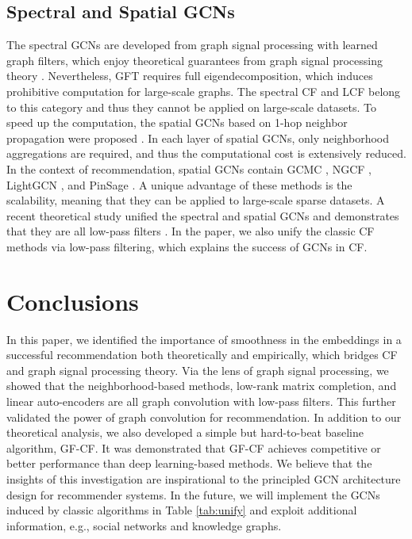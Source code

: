 \documentclass[sigconf]{acmart}
\begin{document}
\subsection{Spectral and Spatial GCNs} The spectral GCNs are developed from graph signal processing with learned graph filters, which enjoy theoretical guarantees from graph signal processing theory \cite{ruiz2021graph}. Nevertheless, GFT requires full eigendecomposition, which induces prohibitive computation for large-scale graphs. The spectral CF \cite{zheng2018spectral} and LCF \cite{yu2020graph} belong to this category and thus they cannot be applied on large-scale datasets. To speed up the computation, the spatial GCNs based on 1-hop neighbor propagation were proposed \cite{xu2018powerful}. In each layer of spatial GCNs, only neighborhood aggregations are required, and thus the computational cost is extensively reduced. In the context of recommendation, spatial GCNs contain GCMC \cite{berg2017graph}, NGCF \cite{wang2019neural}, LightGCN \cite{he2020lightgcn}, and PinSage \cite{ying2018graph}. A unique advantage of these methods is the scalability, meaning that they can be applied to large-scale sparse datasets. A recent theoretical study unified the spectral and spatial GCNs and demonstrates that they are all low-pass filters \cite{balcilar2021analyzing}. In the paper, we also unify the classic CF methods via low-pass filtering, which explains the success of GCNs in CF. 


\section{Conclusions}
\label{sec:con}
In this paper, we identified the importance of smoothness in the embeddings in a successful recommendation both theoretically and empirically, which bridges CF and graph signal processing theory. Via the lens of graph signal processing, we showed that the neighborhood-based methods, low-rank matrix completion, and linear auto-encoders are all graph convolution with low-pass filters. This further validated the power of graph convolution for recommendation. In addition to our theoretical analysis, we also developed a simple but hard-to-beat baseline algorithm, GF-CF. It was demonstrated that GF-CF achieves competitive or better performance than deep learning-based methods. We believe that the insights of this investigation are inspirational to the principled GCN architecture design for recommender systems. In the future, we will implement the GCNs induced by classic algorithms in Table \ref{tab:unify} and exploit additional information, e.g., social networks and knowledge graphs.
\end{document}
